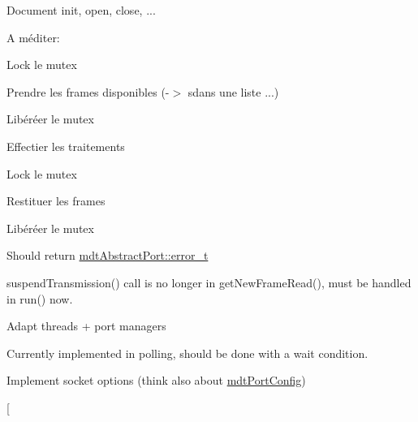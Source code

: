 \begin{DoxyRefList}
Document init, open, close, ... 
\item[\label{todo__todo000029}%
\hypertarget{todo__todo000029}{}%
Member \hyperlink{classmdt_port_manager_a4fcc8f0699b655156e661bb3de6056cc}{mdt\-Port\-Manager\-:\-:from\-Thread\-New\-Frame\-Readen} ()]A méditer\-:
\begin{DoxyItemize}
\item Lock le mutex
\item Prendre les frames disponibles (-\/$>$ sdans une liste ...)
\item Libéréer le mutex
\item Effectier les traitements
\item Lock le mutex
\item Restituer les frames
\item Libéréer le mutex  
\end{DoxyItemize}
\item[\label{todo__todo000032}%
\hypertarget{todo__todo000032}{}%
Member \hyperlink{classmdt_port_manager_aab594613e8985590c835194efbc27b5e}{mdt\-Port\-Manager\-:\-:open\-Port} ()]Should return \hyperlink{classmdt_abstract_port_ad4121bb930c95887e77f8bafa065a85e}{mdt\-Abstract\-Port\-::error\-\_\-t}  
\item[\label{todo__todo000034}%
\hypertarget{todo__todo000034}{}%
Class \hyperlink{classmdt_port_read_thread}{mdt\-Port\-Read\-Thread} ]suspend\-Transmission() call is no longer in get\-New\-Frame\-Read(), must be handled in run() now.  
\item[\label{todo__todo000035}%
\hypertarget{todo__todo000035}{}%
Member \hyperlink{classmdt_port_thread_ab31cbe1a85aa830cd368654d1f806326}{mdt\-Port\-Thread\-:\-:error\-Occured} (int error)]Adapt threads + port managers 
\item[\label{todo__todo000036}%
\hypertarget{todo__todo000036}{}%
Member \hyperlink{classmdt_port_thread_helper_aed853f4cedc143c62e7dad5e38ff4b8c}{mdt\-Port\-Thread\-Helper\-:\-:get\-New\-Frame\-Read} ()]Currently implemented in polling, should be done with a wait condition. 
\item[\label{todo__todo000037}%
\hypertarget{todo__todo000037}{}%
Member \hyperlink{classmdt_port_thread_helper_socket_aa77afb8d26e4863bd437e0d59efae7a7}{mdt\-Port\-Thread\-Helper\-Socket\-:\-:mdt\-Port\-Thread\-Helper\-Socket} (\hyperlink{class_q_object}{Q\-Object} $\ast$parent=0)]Implement socket options (think also about \hyperlink{classmdt_port_config}{mdt\-Port\-Config})  
\item[\label{todo__todo000006}%
\hypertarget{todo__todo000006}{}%

\end{DoxyRefList}
